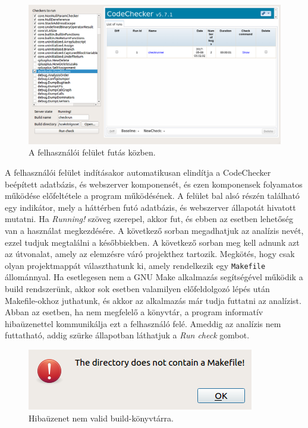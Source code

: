 \documentclass[a4paper,12pt]{report}
\begin{document}
\begin{figure}[h]
\caption{A felhasználói felület futás közben.}
\centering
\includegraphics[scale=0.36]{ui.png}
\end{figure}

A felhasználói felület indításakor automatikusan elindítja a CodeChecker beépített adatbázis, és webszerver komponensét, és ezen komponensek folyamatos működése előfeltétele a program működésének. A felület bal alsó részén található egy indikátor, mely a háttérben futó adatbázis, és webszerver állapotát hivatott mutatni. Ha \emph{Running!} szöveg szerepel, akkor fut, és ebben az esetben lehetőség van a használat megkezdésére. A következő sorban megadhatjuk az analízis nevét, ezzel tudjuk megtalálni a későbbiekben. A következő sorban meg kell adnunk azt az útvonalat, amely az elemzésre váró projekthez tartozik. Megkötés, hogy csak olyan projektmappát választhatunk ki, amely rendelkezik egy \texttt{Makefile} állománnyal. Ha esetlegesen nem a GNU Make alkalmazás segítségével működik a build rendszerünk, akkor sok esetben valamilyen előfeldolgozó lépés után Makefile-okhoz juthatunk, és akkor az alkalmazás már tudja futtatni az analízist. Abban az esetben, ha nem megfelelő a könyvtár, a program informatív hibaüzenettel kommunikálja ezt a felhasználó felé. Ameddig az analízis nem futtatható, addig szürke állapotban láthatjuk a \emph{Run check} gombot.


\begin{figure}[h]
\caption{Hibaüzenet nem valid build-könyvtárra.}
\centering
\includegraphics[scale=0.8]{build_dir_error.png}
\end{figure}
\end{document}

